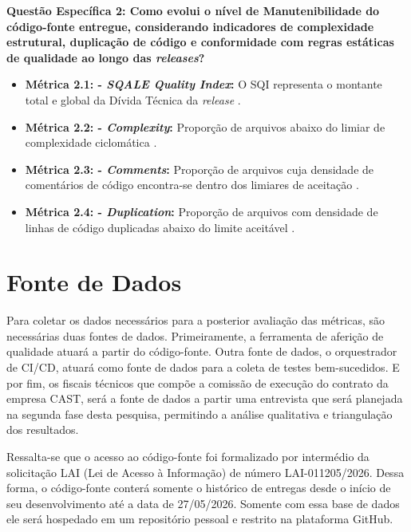 \vspace{0.5cm}
\noindent \textbf{Questão Específica 2: Como evolui o nível de Manutenibilidade do código-fonte entregue, considerando indicadores de complexidade estrutural, duplicação de código e conformidade com regras estáticas de qualidade ao longo das \textit{releases}?}
\begin{itemize}
    \item \textbf{Métrica 2.1: - \textit{SQALE Quality Index}:} O SQI representa o montante total e global da Dívida Técnica da \textit{release} \cite{letouzey2010}. 
    
    \item \textbf{Métrica 2.2: - \textit{Complexity}:} Proporção de arquivos abaixo do
limiar de
complexidade ciclomática  \cite{qrapids2019}.
    
    \item \textbf{Métrica 2.3: - \textit{Comments}:} Proporção de arquivos cuja densidade de comentários de código encontra-se dentro dos limiares de aceitação \cite{qrapids2019}.
    
    \item \textbf{Métrica 2.4: - \textit{Duplication}:} Proporção de arquivos com densidade de linhas de código duplicadas abaixo do limite aceitável  \cite{qrapids2019}.
    

\end{itemize}


\section{Fonte de Dados}

Para coletar os dados necessários para a posterior avaliação das métricas, são necessárias duas fontes de dados. Primeiramente, a ferramenta de aferição de qualidade atuará a partir do código-fonte. Outra fonte de dados, o orquestrador de CI/CD, atuará como fonte de dados para a coleta de testes bem-sucedidos. E por fim, os fiscais técnicos que compõe a comissão de execução do contrato da empresa CAST, será a fonte de dados a partir uma entrevista que será planejada na segunda fase desta pesquisa, permitindo a análise qualitativa e triangulação dos resultados.

Ressalta-se que o acesso ao código-fonte foi formalizado por intermédio da solicitação LAI (Lei de Acesso à Informação) de número LAI-011205/2026. Dessa forma, o código-fonte conterá somente o histórico de entregas desde o início de seu desenvolvimento até a data de 27/05/2026. Somente com essa base de dados ele será hospedado em um repositório pessoal e restrito na plataforma GitHub.

